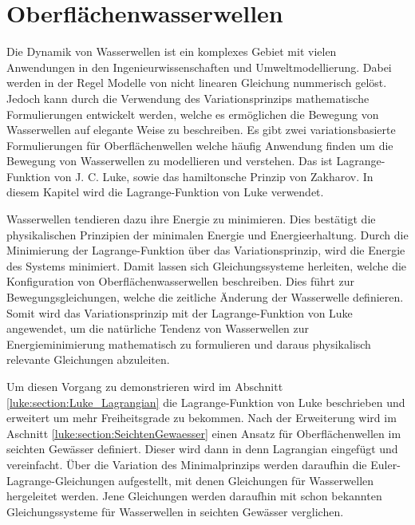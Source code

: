 %
%
%
%
\chapter{Oberflächenwasserwellen\label{chapter:luke}}
\begin{refsection}

Die Dynamik von Wasserwellen ist ein komplexes Gebiet mit vielen Anwendungen in den Ingenieurwissenschaften und Umweltmodellierung.
Dabei werden in der Regel Modelle von nicht linearen Gleichung nummerisch gelöst.
Jedoch kann durch die Verwendung des Variationsprinzips mathematische Formulierungen entwickelt werden, welche es ermöglichen die Bewegung von Wasserwellen auf elegante Weise zu beschreiben.
Es gibt zwei variationsbasierte Formulierungen für Oberflächenwellen welche häufig Anwendung finden um die Bewegung von Wasserwellen zu modellieren und verstehen.
Das ist Lagrange-Funktion von J. C. Luke, sowie das hamiltonsche Prinzip von Zakharov.
In diesem Kapitel wird die Lagrange-Funktion von Luke verwendet.

Wasserwellen tendieren dazu ihre Energie zu minimieren.
Dies bestätigt die physikalischen Prinzipien der minimalen Energie und Energieerhaltung.
Durch die Minimierung der Lagrange-Funktion über das Variationsprinzip, wird die Energie des Systems minimiert. Damit lassen sich Gleichungssysteme herleiten, welche die Konfiguration von Oberflächenwasserwellen beschreiben.
Dies führt zur Bewegungsgleichungen, welche die zeitliche Änderung der Wasserwelle definieren.
Somit wird das Variationsprinzip mit der Lagrange-Funktion von Luke angewendet, um die natürliche Tendenz von Wasserwellen zur Energieminimierung mathematisch zu formulieren und daraus physikalisch relevante Gleichungen abzuleiten.

Um diesen Vorgang zu demonstrieren wird im Abschnitt \ref{luke:section:Luke_Lagrangian} die Lagrange-Funktion von Luke beschrieben und erweitert um mehr Freiheitsgrade zu bekommen.
Nach der Erweiterung wird im Aschnitt \ref{luke:section:SeichtenGewaesser} einen Ansatz für Oberflächenwellen im seichten Gewässer definiert.
Dieser wird dann in denn Lagrangian eingefügt und vereinfacht. Über die Variation des Minimalprinzips werden daraufhin die Euler-Lagrange-Gleichungen aufgestellt, mit denen Gleichungen für Wasserwellen hergeleitet werden. Jene Gleichungen werden daraufhin mit schon bekannten Gleichungssysteme für Wasserwellen in seichten Gewässer verglichen.




\printbibliography[heading=subbibliography]
\end{refsection}

